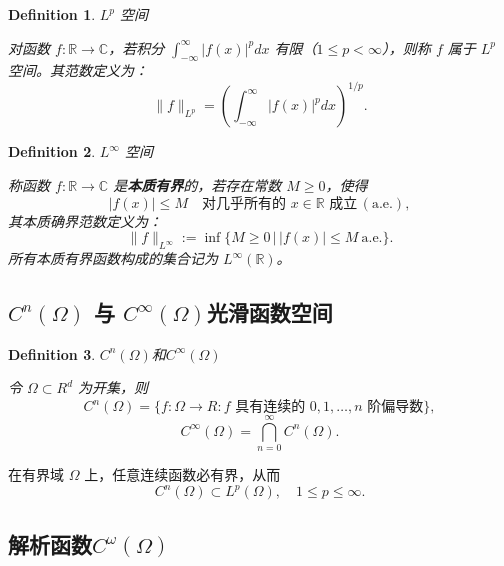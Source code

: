\documentclass[linespread=1.5,openany]{book}%
\def\R{R}%
\theoremstyle{plain}
\newtheorem{definition}{Definition}
\newcommand{\R}{\mathbb{R}}                %
\begin{document}
{{{{{{{{										\begin{definition}$L^p$ 空间
											
											对函数 $f: \mathbb{R} \to \mathbb{C}$，若积分 $\int_{-\infty}^\infty |f(x)|^p dx$ 有限（$1 \leq p < \infty$），则称 $f$ 属于 $L^p$ 空间。其范数定义为：
											\[
											\|f\|_{L^p} = \left( \int_{-\infty}^\infty |f(x)|^p dx \right)^{1/p}.
											\]
										\end{definition}
										
										\begin{definition}$L^\infty$ 空间
											
											称函数 $f: \mathbb{R} \to \mathbb{C}$ 是\textbf{本质有界}的，若存在常数 $M \geq 0$，使得
											\[
											|f(x)| \leq M \quad \text{对几乎所有的 } x \in \mathbb{R} \text{ 成立} \, (\text{a.e.}),
											\]
											其本质确界范数定义为：
											\[
											\|f\|_{L^\infty} := \inf \big\{ M \geq 0 \,\big|\, |f(x)| \leq M \ \text{a.e.} \big\}.
											\]
											所有本质有界函数构成的集合记为 $L^\infty(\mathbb{R})$。
										\end{definition}
										
										
										
										
										
										\subsection{\texorpdfstring{$C^n(\Omega)$}{Cn} 与 \texorpdfstring{$C^\infty(\Omega)$}{C∞}光滑函数空间}
										
										\begin{definition}$C^n(\Omega)$和$C^\infty(\Omega)$
											
											令 $\Omega\subset\R^d$ 为开集，则
											\[
											C^n(\Omega)
											=\{f:\Omega\to\R:\text{$f$ 具有连续的 $0,1,\dots,n$ 阶偏导数}\},
											\]
											\[
											C^\infty(\Omega)
											=\bigcap_{n=0}^\infty C^n(\Omega).
											\]
										\end{definition}
										
										在有界域 $\Omega$ 上，任意连续函数必有界，从而
										\[
										C^n(\Omega)\subset L^p(\Omega),\quad 1\le p\le\infty.
										\]
										
										\subsection{解析函数$C^\omega(\Omega)$}
										
}}}}}}}}
\end{document}
